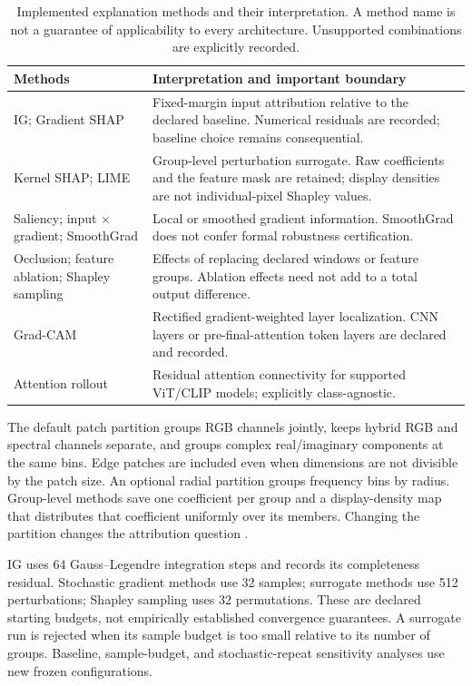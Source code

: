 \documentclass{article}
\begin{document}
\begin{table}[t]
\caption{Implemented explanation methods and their interpretation. A method name is not a guarantee of applicability to every architecture. Unsupported combinations are explicitly recorded.}
\label{tab:methods}
\centering\small
\begin{tabular}{p{.27\linewidth}p{.65\linewidth}}
\toprule
Methods & Interpretation and important boundary\\
\midrule
IG; Gradient SHAP & Fixed-margin input attribution relative to the declared baseline. Numerical residuals are recorded; baseline choice remains consequential.\\
Kernel SHAP; LIME & Group-level perturbation surrogate. Raw coefficients and the feature mask are retained; display densities are not individual-pixel Shapley values.\\
Saliency; input $\times$ gradient; SmoothGrad & Local or smoothed gradient information. SmoothGrad does not confer formal robustness certification.\\
Occlusion; feature ablation; Shapley sampling & Effects of replacing declared windows or feature groups. Ablation effects need not add to a total output difference.\\
Grad-CAM & Rectified gradient-weighted layer localization. CNN layers or pre-final-attention token layers are declared and recorded.\\
Attention rollout & Residual attention connectivity for supported ViT/CLIP models; explicitly class-agnostic.\\
\bottomrule
\end{tabular}
\end{table}

The default patch partition groups RGB channels jointly, keeps hybrid RGB and spectral channels separate, and groups complex real/imaginary components at the same bins. Edge patches are included even when dimensions are not divisible by the patch size. An optional radial partition groups frequency bins by radius. Group-level methods save one coefficient per group and a display-density map that distributes that coefficient uniformly over its members. Changing the partition changes the attribution question \citep{zheng2025}.

IG uses 64 Gauss--Legendre integration steps and records its completeness residual. Stochastic gradient methods use 32 samples; surrogate methods use 512 perturbations; Shapley sampling uses 32 permutations. These are declared starting budgets, not empirically established convergence guarantees. A surrogate run is rejected when its sample budget is too small relative to its number of groups. Baseline, sample-budget, and stochastic-repeat sensitivity analyses use new frozen configurations.
\end{document}
